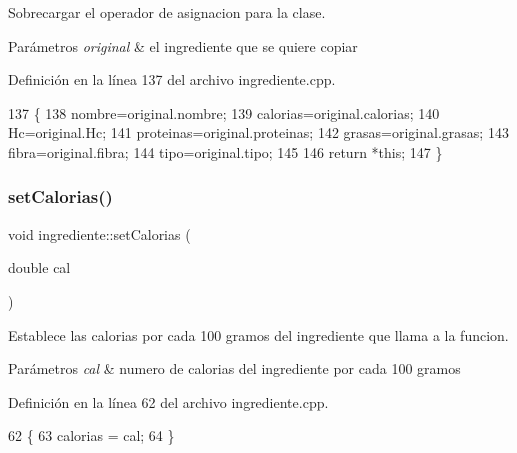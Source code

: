 Sobrecargar el operador de asignacion para la clase. 


\begin{DoxyParams}{Parámetros}
{\em original} & el ingrediente que se quiere copiar \\
\hline
\end{DoxyParams}


Definición en la línea 137 del archivo ingrediente.\+cpp.


\begin{DoxyCode}
137                                                                 \{
138     nombre=original.nombre;
139     calorias=original.calorias;
140     Hc=original.Hc;
141     proteinas=original.proteinas;
142     grasas=original.grasas;
143     fibra=original.fibra;
144     tipo=original.tipo;
145         
146         \textcolor{keywordflow}{return} *\textcolor{keyword}{this};
147 \}
\end{DoxyCode}
\mbox{\label{classingrediente_ae9852183a6cdcf8dc3b99be6c80036f5}} 
\subsubsection{\texorpdfstring{set\+Calorias()}{setCalorias()}}
{\footnotesize\ttfamily void ingrediente\+::set\+Calorias (\begin{DoxyParamCaption}\item[{double}]{cal }\end{DoxyParamCaption})}



Establece las calorias por cada 100 gramos del ingrediente que llama a la funcion. 


\begin{DoxyParams}{Parámetros}
{\em cal} & numero de calorias del ingrediente por cada 100 gramos \\
\hline
\end{DoxyParams}


Definición en la línea 62 del archivo ingrediente.\+cpp.


\begin{DoxyCode}
62                                        \{
63     calorias = cal;
64 \}
\end{DoxyCode}
\mbox{\label{classingrediente_adb475903f54423f6800b96ee995ed31c}} 

